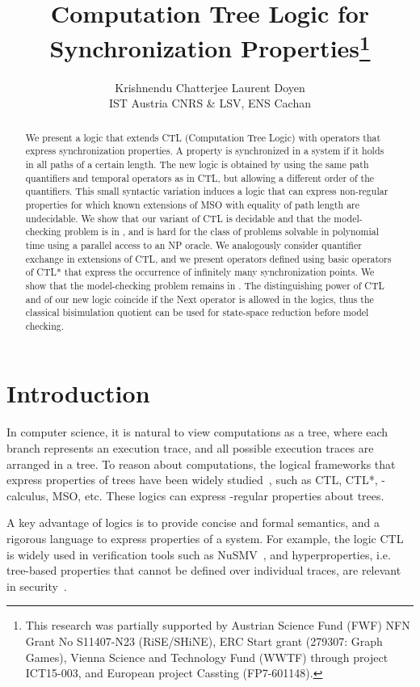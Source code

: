 \documentclass{article}
\title{{\bf Computation Tree Logic for Synchronization 
Properties}\footnote{This research was partially supported by Austrian Science Fund (FWF) 
NFN Grant No S11407-N23 (RiSE/SHiNE), ERC Start grant (279307: Graph Games), 
Vienna Science and Technology Fund (WWTF) through project ICT15-003,
and European project Cassting (FP7-601148).
}}
\author{
Krishnendu Chatterjee \quad  Laurent Doyen \\ 
\normalsize
  IST Austria \quad  CNRS \& LSV, ENS Cachan 
}
\date{}
\begin{document}
\sloppy
\providecommand*{\donothing}[1]{}

\maketitle 
\pagestyle{plain}

\begin{abstract}
We present a logic that extends CTL (Computation Tree Logic) 
with operators that express synchronization properties.
A property is synchronized in a system if it holds in all 
paths of a certain length. 
The new logic is obtained by using the same path quantifiers 
and temporal operators as in CTL, but allowing a different order
of the quantifiers. This small syntactic variation induces 
a logic that can express non-regular properties for which known extensions
of MSO with equality of path length are undecidable.
We show that our variant of CTL is decidable and that the model-checking
problem is in , and is hard
for the class of problems solvable in polynomial time using a
parallel access to an NP oracle.
We analogously consider quantifier exchange in extensions of CTL, and 
we present operators defined using basic operators of CTL* that express
the occurrence of infinitely many synchronization points.
We show that the model-checking problem remains in .
The distinguishing power of CTL and of our new logic coincide
if the Next operator is allowed in the logics, thus the classical 
bisimulation quotient can be used for state-space reduction before model checking.
\end{abstract}


\section{Introduction}
In computer science, it is natural to view computations as a tree, where each branch 
represents an execution trace, and all possible execution traces are arranged in a tree. 
To reason about computations, the logical frameworks that express properties of 
trees have been widely studied~\cite{CGP01,Lenzi10,Thomas97}, such as CTL, CTL*, -calculus, MSO, etc. 
These logics can express -regular properties about trees. 



A key advantage of logics is to provide concise and formal semantics, and 
a rigorous language to express properties of a system. 
For example, the logic CTL is widely used in verification tools such as NuSMV~\cite{CCGR00}, 
and hyperproperties, i.e. tree-based properties that cannot be defined over individual traces, 
are relevant in security~\cite{CFKMRS14,CS10}.
\end{document}

